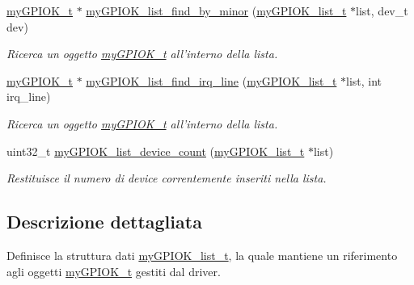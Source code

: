 \begin{DoxyCompactItemize}
\hyperlink{structmy_g_p_i_o_k__t}{my\+G\+P\+I\+O\+K\+\_\+t} $\ast$ \hyperlink{group___device_list_gaf50b0da291040e8da5050194a4979849}{my\+G\+P\+I\+O\+K\+\_\+list\+\_\+find\+\_\+by\+\_\+minor} (\hyperlink{structmy_g_p_i_o_k__list__t}{my\+G\+P\+I\+O\+K\+\_\+list\+\_\+t} $\ast$list, dev\+\_\+t dev)
\begin{DoxyCompactList}\small\item\em Ricerca un oggetto \hyperlink{structmy_g_p_i_o_k__t}{my\+G\+P\+I\+O\+K\+\_\+t} all'interno della lista. \end{DoxyCompactList}\item 
\hyperlink{structmy_g_p_i_o_k__t}{my\+G\+P\+I\+O\+K\+\_\+t} $\ast$ \hyperlink{group___device_list_ga0bb70e18f51367d95fa28f723679ac30}{my\+G\+P\+I\+O\+K\+\_\+list\+\_\+find\+\_\+irq\+\_\+line} (\hyperlink{structmy_g_p_i_o_k__list__t}{my\+G\+P\+I\+O\+K\+\_\+list\+\_\+t} $\ast$list, int irq\+\_\+line)
\begin{DoxyCompactList}\small\item\em Ricerca un oggetto \hyperlink{structmy_g_p_i_o_k__t}{my\+G\+P\+I\+O\+K\+\_\+t} all'interno della lista. \end{DoxyCompactList}\item 
uint32\+\_\+t \hyperlink{group___device_list_ga731d5b5cbb96c6c5ef53936c23cdc58a}{my\+G\+P\+I\+O\+K\+\_\+list\+\_\+device\+\_\+count} (\hyperlink{structmy_g_p_i_o_k__list__t}{my\+G\+P\+I\+O\+K\+\_\+list\+\_\+t} $\ast$list)
\begin{DoxyCompactList}\small\item\em Restituisce il numero di device correntemente inseriti nella lista. \end{DoxyCompactList}\end{DoxyCompactItemize}


\subsection{Descrizione dettagliata}
Definisce la struttura dati \hyperlink{structmy_g_p_i_o_k__list__t}{my\+G\+P\+I\+O\+K\+\_\+list\+\_\+t}, la quale mantiene un riferimento agli oggetti \hyperlink{structmy_g_p_i_o_k__t}{my\+G\+P\+I\+O\+K\+\_\+t} gestiti dal driver. 



